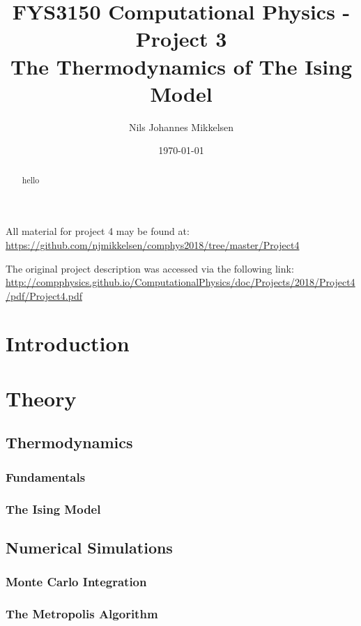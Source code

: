 \documentclass[nofootinbib,reprint,english]{revtex4-1}
\begin{document}
\title{FYS3150 Computational Physics - Project 3\\The Thermodynamics of The Ising Model}
\author{Nils Johannes Mikkelsen}
\date{\today}
\noaffiliation
\begin{abstract}
hello
\end{abstract}
\maketitle

All material for project 4 may be found at:\\
{\scriptsize\url{https://github.com/njmikkelsen/comphys2018/tree/master/Project4}}

The original project description was accessed via the following link: \cite{project}\\
{\scriptsize\url{http://compphysics.github.io/ComputationalPhysics/doc/Projects/2018/Project4/pdf/Project4.pdf}}

\section{Introduction}
\section{Theory}


\subsection{Thermodynamics}
\subsubsection{Fundamentals}
\subsubsection{The Ising Model}

\subsection{Numerical Simulations}
\subsubsection{Monte Carlo Integration}
\subsubsection{The Metropolis Algorithm}
\end{document}
